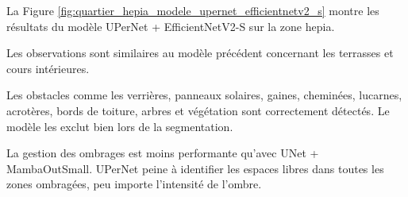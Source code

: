 
\newpage
La Figure \ref{fig:quartier_hepia_modele_upernet_efficientnetv2_s} montre les résultats du modèle UPerNet + EfficientNetV2-S sur la zone \acrshort{hepia}.

Les observations sont similaires au modèle précédent concernant les terrasses et cours intérieures.

Les obstacles comme les verrières, panneaux solaires, gaines, cheminées, lucarnes, acrotères, bords de toiture, arbres et végétation sont correctement détectés. Le modèle les exclut bien lors de la segmentation.

La gestion des ombrages est moins performante qu'avec UNet + MambaOutSmall. UPerNet peine à identifier les espaces libres dans toutes les zones ombragées, peu importe l'intensité de l'ombre.

